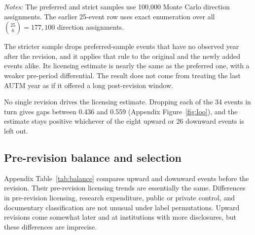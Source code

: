 \begin{table}[htbp]\centering
\caption{Alternative documentary event samples: licensing and filing margin}\label{tab:robust}
\footnotesize
{}
\vspace{2pt}

\parbox{0.94\textwidth}{\footnotesize\textit{Notes:} The preferred and strict samples use 100,000 Monte Carlo direction assignments. The earlier 25-event row uses exact enumeration over all $\binom{25}{6}=177{,}100$ direction assignments.}
\end{table}

The stricter sample drops preferred-sample events that have no observed year after the revision, and it applies that rule to the original and the newly added events alike. Its licensing estimate is nearly the same as the preferred one, with a weaker pre-period differential. The result does not come from treating the last AUTM year as if it offered a long post-revision window.

No single revision drives the licensing estimate. Dropping each of the 34 events in turn gives gaps between 0.436 and 0.559 (Appendix Figure~\ref{fig:loo}), and the estimate stays positive whichever of the eight upward or 26 downward events is left out.

\subsection*{Pre-revision balance and selection}

Appendix Table~\ref{tab:balance} compares upward and downward events before the revision. Their pre-revision licensing trends are essentially the same. Differences in pre-revision licensing, research expenditure, public or private control, and documentary classification are not unusual under label permutations. Upward revisions come somewhat later and at institutions with more disclosures, but these differences are imprecise.


